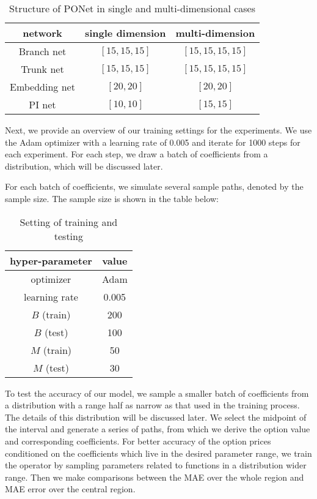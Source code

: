 \documentclass[11pt,a4paper]{article}
\theoremstyle{remark}
\begin{document}
	\begin{table}[htbp]
		\centering
		\begin{tabular}{ccc}
			\hline
			network  & single dimension & multi-dimension \\
			\hline  
			Branch net &  $[15, 15, 15]$  & $[15, 15, 15, 15]$  \\
			Trunk net& $[15, 15, 15]$  & $[15, 15, 15, 15]$  \\
			
			Embedding net& $[20, 20]$ & $[20, 20]$  \\
			PI net& $[10, 10]$  & $[15, 15]$  \\
			\hline
		\end{tabular}
		\caption{Structure of PONet in single and multi-dimensional cases}
		\label{tab:structure1}
	\end{table}
	
	Next, we provide an overview of our training settings for the experiments. We use the Adam optimizer with a learning rate of 0.005 and iterate for 1000 steps for each experiment. For each step, we draw a batch of coefficients from a distribution, which will be discussed later.
	
	For each batch of coefficients, we simulate several sample paths, denoted by the sample size. The sample size is shown in the table below:
	\begin{table}[htbp]
		\centering
		\begin{tabular}{cc}
			\hline		
			hyper-parameter & value \\
			\hline   optimizer &Adam \\
			learning rate & 0.005\\
			$B$ (train) & 200\\
			$B$ (test) & 100\\
			$M$ (train) & 50\\
			$M$ (test) & 30\\
			\hline
			
			
		\end{tabular}
		\caption{Setting of training and testing}
		\label{tab:training setting}
	\end{table}
	
	To test the accuracy of our model, we sample a smaller batch of coefficients from a distribution with a range half as narrow as that used in the training process. The details of this distribution will be discussed later. We select the midpoint of the interval and generate a series of paths, from which we derive the option value and corresponding coefficients. For better accuracy of the option prices conditioned on the coefficients which live in the desired parameter range, we train the operator by sampling parameters related to functions in a distribution wider range. Then we make comparisons between the MAE over the whole region and MAE error over the central region.
\end{document}
